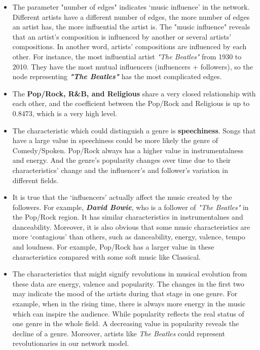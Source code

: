 \documentclass[12pt]{article}
\begin{document}
\begin{itemize}
\item  The parameter "number of edges" indicates ‘music influence’ in the network. Different artists have a different number of edges, the more number of edges an artist has, the more influential the artist is. The "music influence" reveals that an artist's composition is influenced by another or several artists' compositions. In another word, artists' compositions are influenced by each other. For instance, the most influential artist \emph{"The Beatles"} from 1930 to 2010. They have the most mutual influencers (influencers + followers), so the node representing \emph{\textbf{"The Beatles"}} has the most complicated edges.

\item The \textbf{Pop/Rock, R\&B, and Religious} share a very closed relationship with each other, and the coefficient between the Pop/Rock and Religious is up to 0.8473, which is a very high level. 

\item The characteristic which could distinguish a genre is \textbf{speechiness}. Songs that have a large value in speechiness could be more likely the genre of Comedy/Spoken. Pop/Rock always has a higher value in instrumentalness and energy. And the genre’s popularity changes over time due to their characteristics’ change and the influencer's and follower’s variation in different fields. 

\item It is true that the ‘influencers’ actually affect the music created by the followers. For example, \emph{\textbf{David Bowie}}, who is a follower of \emph{"The Beatles"} in the Pop/Rock region. It has similar characteristics in instrumentalnes and danceability. Moreover, it is also obvious that some music characteristics are more ‘contagious’ than others, such as danceability, energy, valence, tempo and loudness. For example, Pop/Rock has a larger value in these characteristics compared with some soft music like Classical.

\item The characteristics that might signify revolutions in musical evolution from these data are energy, valence and popularity. The changes in the first two may indicate the mood of the artists during that stage in one genre. For example, when in the rising time, there is always more energy in the music which can inspire the audience. While popularity reflects the real status of one genre in the whole field. A decreasing value in popularity reveals the decline of a genre. Moreover, artists like \emph{The Beatles} could represent revolutionaries in our network model.


\end{itemize}
\end{document}
